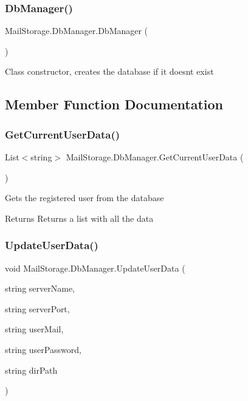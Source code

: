 \subsubsection{\texorpdfstring{Db\+Manager()}{DbManager()}}
{\footnotesize\ttfamily Mail\+Storage.\+Db\+Manager.\+Db\+Manager (\begin{DoxyParamCaption}{ }\end{DoxyParamCaption})}



Class constructor, creates the database if it doesn\textquotesingle{}t exist 



\subsection{Member Function Documentation}
\mbox{\label{class_mail_storage_1_1_db_manager_add360de0a5bb47870412e69741da22f3}} 
\subsubsection{\texorpdfstring{Get\+Current\+User\+Data()}{GetCurrentUserData()}}
{\footnotesize\ttfamily List$<$string$>$ Mail\+Storage.\+Db\+Manager.\+Get\+Current\+User\+Data (\begin{DoxyParamCaption}{ }\end{DoxyParamCaption})}



Gets the registered user from the database 

\begin{DoxyReturn}{Returns}
Returns a list with all the data
\end{DoxyReturn}
\mbox{\label{class_mail_storage_1_1_db_manager_a862704b090f1a99e33682f701c6f8ba2}} 
\subsubsection{\texorpdfstring{Update\+User\+Data()}{UpdateUserData()}}
{\footnotesize\ttfamily void Mail\+Storage.\+Db\+Manager.\+Update\+User\+Data (\begin{DoxyParamCaption}\item[{string}]{server\+Name,  }\item[{string}]{server\+Port,  }\item[{string}]{user\+Mail,  }\item[{string}]{user\+Password,  }\item[{string}]{dir\+Path }\end{DoxyParamCaption})}



